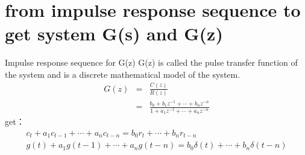 %    
%    
%    

\section{from impulse response sequence to get  system G(s) and G(z)}
\begin{frame}{Impulse response sequence for G(z)}
G(z) is called the pulse transfer function of the system and is a discrete mathematical model of the system.
\begin{eqnarray*}
G(z)&=&\frac{C(z)}{R(z)}  \\
&=&\frac{b_0+b_1 z^{-1}+\cdots+b_n z^{-n}}{1+a_1 z^{-1}+\cdots+a_n z^{-n}}
\end{eqnarray*}
get：
\begin{eqnarray*}
c_t+a_1 c_{t-1}+\cdots+ a_n c_{t-n} =  b_0 r_t+ \cdots + b_n r_{t-n}  \\
g(t)+a_1 g(t-1)+\cdots+ a_n g(t-n) =  b_0 \delta(t)+ \cdots + b_n \delta(t-n)
\end{eqnarray*}
\end{frame}

